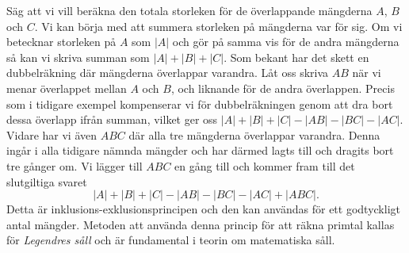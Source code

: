Säg att vi vill beräkna den totala storleken för de överlappande mängderna $A$, $B$ och $C$. 
Vi kan börja med att summera storleken på mängderna var för sig.
Om vi betecknar storleken på $A$ som $|A|$ och gör på samma vis för de andra mängderna så kan vi skriva summan som $|A|+|B|+|C|$.
Som bekant har det skett en dubbelräkning där mängderna överlappar varandra.
Låt oss skriva $AB$ när vi menar överlappet mellan $A$ och $B$, och liknande för de andra överlappen.
Precis som i tidigare exempel kompenserar vi för dubbelräkningen genom att dra bort dessa överlapp ifrån summan, vilket ger oss $|A|+|B|+|C|-|AB|-|BC|-|AC|$.
Vidare har vi även $ABC$ där alla tre mängderna överlappar varandra.
Denna ingår i alla tidigare nämnda mängder och har därmed lagts till och dragits bort tre gånger om. 
Vi lägger till $ABC$ en gång till och kommer fram till det slutgiltiga svaret
\begin{equation*}
    |A|+|B|+|C|-|AB|-|BC|-|AC|+|ABC|.
\end{equation*}
Detta är inklusions-exklusionsprincipen och den kan användas för ett godtyckligt antal mängder.
Metoden att använda denna princip för att räkna primtal kallas för \textit{Legendres såll} och är fundamental i teorin om matematiska såll.


